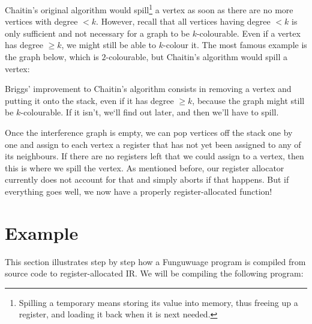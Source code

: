 \documentclass[12pt]{report}
\newcommand{\langname}{Funguwuage}
\begin{document}
Chaitin’s original algorithm would spill\footnote{Spilling a temporary means storing its value into memory, thus freeing up a register, and
loading it back when it is next needed.} a vertex as soon as there are no more vertices with degree $< k$. However, recall that all
vertices having degree $< k$ is only sufficient and not necessary for a graph to be $k$-colourable. Even if a vertex has degree $\geq k$, we
might still be able to $k$-colour it. The most famous example is the graph below, which is $2$-colourable, but Chaitin’s algorithm would
spill a vertex:
\begin{center}
\end{center}

\noindent Briggs’ improvement to Chaitin’s algorithm consists in removing a vertex and putting it onto the stack, even if it has degree
$\geq k$, because the graph might still be $k$-colourable. If it isn’t, we‘ll find out later, and then we’ll have to spill.

Once the interference graph is empty, we can pop vertices off the stack one by one and assign to each vertex a register that has not yet
been assigned to any of its neighbours. If there are no registers left that we could assign to a vertex, then this is where we spill the 
vertex. As mentioned before, our register allocator currently does not account for that and simply aborts if that happens. But if everything
goes well, we now have a properly register-allocated function!

\section{Example}
This section illustrates step by step how a \langname{} program is compiled from source code to register-allocated IR. We will be compiling
the following program:






\end{document}
